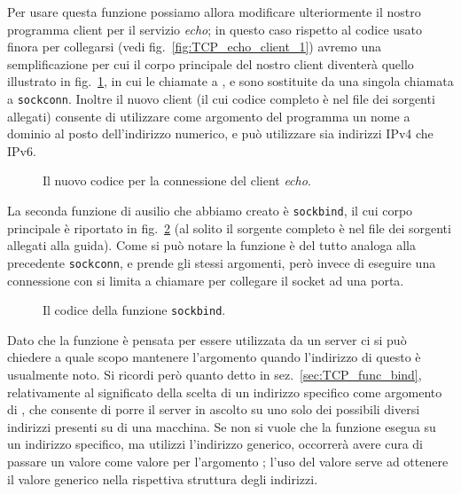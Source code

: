 Per usare questa funzione possiamo allora modificare ulteriormente il nostro
programma client per il servizio \textit{echo}; in questo caso rispetto al
codice usato finora per collegarsi (vedi fig.~\ref{fig:TCP_echo_client_1})
avremo una semplificazione per cui il corpo principale del nostro client
diventerà quello illustrato in fig.~\ref{fig:TCP_echo_fifth}, in cui le
chiamate a ,  e  sono sostituite
da una singola chiamata a \texttt{sockconn}. Inoltre il nuovo client (il cui
codice completo è nel file  dei sorgenti allegati)
consente di utilizzare come argomento del programma un nome a dominio al posto
dell'indirizzo numerico, e può utilizzare sia indirizzi IPv4 che IPv6.

\begin{figure}[!htb]
  \footnotesize \centering
  \begin{minipage}[c]{\codesamplewidth}
  \end{minipage}
  \normalsize
  \caption{Il nuovo codice per la connessione del client \textit{echo}.}
  \label{fig:TCP_echo_fifth}
\end{figure}

La seconda funzione di ausilio che abbiamo creato è \texttt{sockbind}, il cui
corpo principale è riportato in fig.~\ref{fig:sockbind_code} (al solito il
sorgente completo è nel file  dei sorgenti allegati alla
guida). Come si può notare la funzione è del tutto analoga alla precedente
\texttt{sockconn}, e prende gli stessi argomenti, però invece di eseguire una
connessione con  si limita a chiamare  per collegare
il socket ad una porta.

\begin{figure}[!htb]
  \footnotesize \centering
  \begin{minipage}[c]{\codesamplewidth}
  \end{minipage}
  \normalsize
  \caption{Il codice della funzione \texttt{sockbind}.}
  \label{fig:sockbind_code}
\end{figure}

Dato che la funzione è pensata per essere utilizzata da un server ci si può
chiedere a quale scopo mantenere l'argomento  quando l'indirizzo
di questo è usualmente noto. Si ricordi però quanto detto in
sez.~\ref{sec:TCP_func_bind}, relativamente al significato della scelta di un
indirizzo specifico come argomento di , che consente di porre il
server in ascolto su uno solo dei possibili diversi indirizzi presenti su di
una macchina.  Se non si vuole che la funzione esegua  su un
indirizzo specifico, ma utilizzi l'indirizzo generico, occorrerà avere cura di
passare un valore  come valore per l'argomento ; l'uso
del valore  serve ad ottenere il valore generico nella
rispettiva struttura degli indirizzi.

